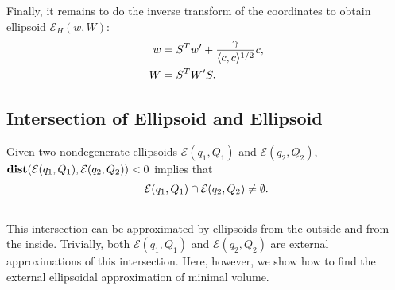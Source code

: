 \documentclass[letterpaper,10pt,english]{sphinxmanual}
\begin{document}
Finally, it remains to do the inverse transform of the coordinates to
obtain ellipsoid ${\mathcal E}_H(w,W)$:
\begin{gather}
\begin{split}\begin{aligned}
w & = S^Tw' + \frac{\gamma}{\langle c,c\rangle^{1/2}}c, \\
W & = S^TW'S.\end{aligned}\end{split}\notag
\end{gather}

\subsection{Intersection of Ellipsoid and Ellipsoid}
\label{main_source:intersection-of-ellipsoid-and-ellipsoid}
Given two nondegenerate ellipsoids ${\mathcal E}(q_1,Q_1)$ and
${\mathcal E}(q_2,Q_2)$,
${\bf dist}({\mathcal E}(q_1,Q_1),{\mathcal E}(q_2,Q_2))<0$
implies that
\begin{gather}
\begin{split}{\mathcal E}(q_1,Q_1)\cap{\mathcal E}(q_2,Q_2)\neq\emptyset .\end{split}\notag\\\begin{split}\end{split}\notag
\end{gather}
This intersection can be approximated by ellipsoids from the outside
and from the inside. Trivially, both ${\mathcal E}(q_1,Q_1)$ and
${\mathcal E}(q_2,Q_2)$ are external approximations of this
intersection. Here, however, we show how to find the external
ellipsoidal approximation of minimal volume.
\end{document}
